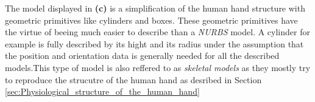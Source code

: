 The model displayed in \textbf{(c)} is a simplification of the human hand structure with geometric primitives like cylinders and boxes. These geometric primitives have the virtue of beeing much easier to describe than a \textit{NURBS} model. A cylinder for example is fully described by its hight and its radius under the assumption that the position and orientation data is generally needed for all the described models.This type of model is also reffered to as \textit{skeletal models} as they mostly try to reproduce the strucutre of the human hand as desribed in Section \ref{sec:Physiological_structure_of_the_human_hand}





